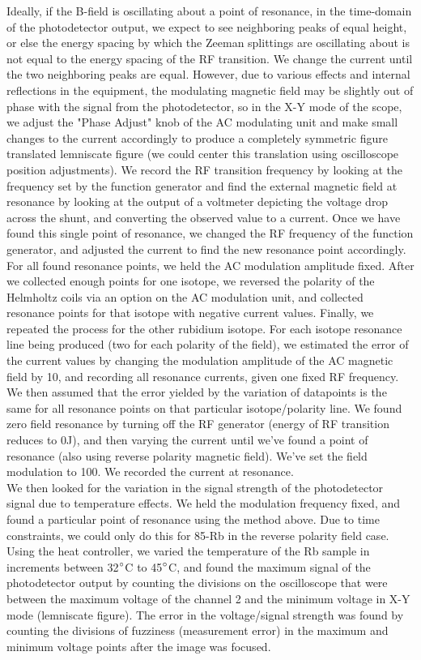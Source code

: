 \documentclass{article}
\begin{document}
    \indent Ideally, if the B-field is oscillating about a point of resonance, in the time-domain of the photodetector output, we expect to see neighboring peaks of equal height, or else the energy spacing by which the Zeeman splittings are oscillating about is not equal to the energy spacing of the RF transition. We change the current until the two neighboring peaks are equal. However, due to various effects and internal reflections in the equipment, the modulating magnetic field may be slightly out of phase with the signal from the photodetector, so in the X-Y mode of the scope, we adjust the "Phase Adjust" knob of the AC modulating unit and make small changes to the current accordingly to produce a completely symmetric figure translated lemniscate figure (we could center this translation using oscilloscope position adjustments). We record the RF transition frequency by looking at the frequency set by the function generator and find the external magnetic field at resonance by looking at the output of a voltmeter depicting the voltage drop across the shunt, and converting the observed value to a current. Once we have found this single point of resonance, we changed the RF frequency of the function generator, and adjusted the current to find the new resonance point accordingly. For all found resonance points, we held the AC modulation amplitude fixed. After we collected enough points for one isotope, we reversed the polarity of the Helmholtz coils via an option on the AC modulation unit, and collected resonance points for that isotope with negative current values. Finally, we repeated the process for the other rubidium isotope. For each isotope resonance line being produced (two for each polarity of the field), we estimated the error of the current values by changing the modulation amplitude of the AC magnetic field by 10, and recording all resonance currents, given one fixed RF frequency. We then assumed that the error yielded by the variation of datapoints is the same for all resonance points on that particular isotope/polarity line. 
    \indent We found zero field resonance by turning off the RF generator (energy of RF transition reduces to 0J), and then varying the current until we've found a point of resonance (also using reverse polarity magnetic field). We've set the field modulation to 100. We recorded the current at resonance.
    \\\indent We then looked for the variation in the signal strength of the photodetector signal due to temperature effects. We held the modulation frequency fixed, and found a particular point of resonance using the method above. Due to time constraints, we could only do this for 85-Rb in the reverse polarity field case. Using the heat controller, we varied the temperature of the Rb sample in increments between 32$\degree$C to 45$\degree$C, and found the maximum signal of the photodetector output by counting the divisions on the oscilloscope that were between the maximum voltage of the channel 2 and the minimum voltage in X-Y mode (lemniscate figure). The error in the voltage/signal strength was found by counting the divisions of fuzziness (measurement error) in the maximum and minimum voltage points after the image was focused. 
\end{document}
